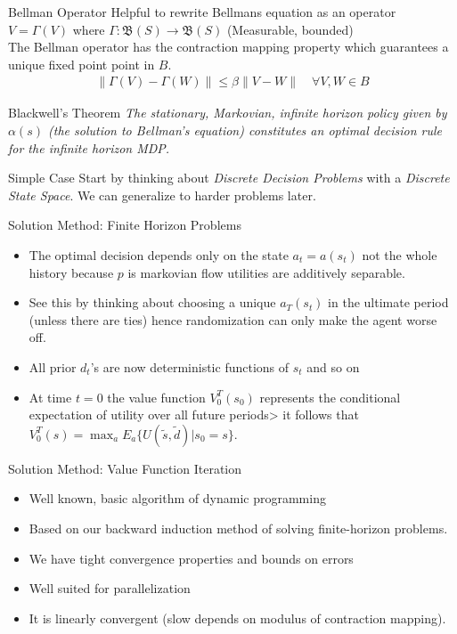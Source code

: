 \begin{frame}{Bellman Operator}
Helpful to rewrite Bellmans equation as an operator $V = \Gamma(V)$ where $\Gamma: \mathfrak{B}(S) \rightarrow \mathfrak{B}(S)$ (Measurable, bounded) \\
\vspace{0.5cm}
The Bellman operator has the contraction mapping property which guarantees a unique fixed point point in $B$.
\begin{eqnarray*}
\| \Gamma(V) - \Gamma(W) \| \leq \beta \| V-W \| \quad \forall V,W \in B
\end{eqnarray*}
\begin{block}{Blackwell's Theorem}
\textit{The stationary, Markovian, infinite horizon policy given by $\alpha(s)$ (the solution to Bellman's equation)  constitutes an optimal decision rule for the infinite horizon MDP.}
\end{block}
\end{frame}

\begin{frame}{Simple Case}
Start by thinking about \textit{Discrete Decision Problems} with a \textit{Discrete State Space}.  We can generalize to harder problems later.
\end{frame}

\begin{frame}{Solution Method: Finite Horizon Problems}
\begin{itemize}
\item The optimal decision depends only on the state $a_t = a(s_t)$ not the whole history because $p$ is markovian flow utilities are additively separable.
\item See this by thinking about choosing a unique $a_T(s_t)$ in the ultimate period (unless there are ties) hence randomization can only make the agent worse off.
\item All prior $d_t$'s are now deterministic functions of $s_t$ and so on
\item At time $t=0$ the value function $V_0^T(s_0)$ represents the conditional expectation of utility over all future periods> it follows that $V_0^T(s) = \max_{a} E_{a}\{ U(\tilde{s},\tilde{d}) | s_0 = s\}$.
\end{itemize}
\end{frame}

\begin{frame}{Solution Method: Value Function Iteration}
\begin{itemize}
\item Well known, basic algorithm of dynamic programming
\item Based on our backward induction method of solving finite-horizon problems.
\item We have tight convergence properties and bounds on errors
\item Well suited for parallelization
\item It is linearly convergent (slow depends on modulus of contraction mapping).
\end{itemize}
\end{frame}

